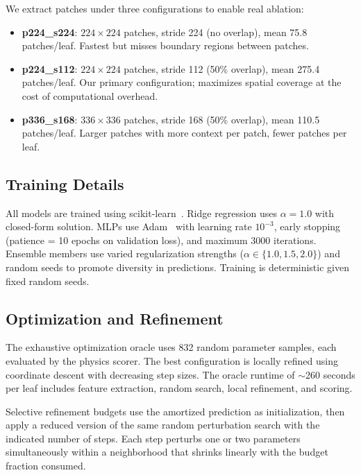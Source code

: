 \documentclass[11pt,a4paper]{article}
\begin{document}
We extract patches under three configurations to enable real ablation:
\begin{itemize}[nosep]
    \item \textbf{p224\_s224}: $224 \times 224$ patches, stride 224 (no overlap), mean 75.8 patches/leaf. Fastest but misses boundary regions between patches.
    \item \textbf{p224\_s112}: $224 \times 224$ patches, stride 112 (50\% overlap), mean 275.4 patches/leaf. Our primary configuration; maximizes spatial coverage at the cost of computational overhead.
    \item \textbf{p336\_s168}: $336 \times 336$ patches, stride 168 (50\% overlap), mean 110.5 patches/leaf. Larger patches with more context per patch, fewer patches per leaf.
\end{itemize}

\subsection{Training Details}

All models are trained using scikit-learn~\citep{scikit-learn}.
Ridge regression uses $\alpha = 1.0$ with closed-form solution.
MLPs use Adam~\citep{kingma2014adam} with learning rate $10^{-3}$, early stopping (patience = 10 epochs on validation loss), and maximum 3000 iterations.
Ensemble members use varied regularization strengths ($\alpha \in \{1.0, 1.5, 2.0\}$) and random seeds to promote diversity in predictions.
Training is deterministic given fixed random seeds.

\subsection{Optimization and Refinement}

The exhaustive optimization oracle uses 832 random parameter samples, each evaluated by the physics scorer.
The best configuration is locally refined using coordinate descent with decreasing step sizes.
The oracle runtime of $\sim$260 seconds per leaf includes feature extraction, random search, local refinement, and scoring.

Selective refinement budgets use the amortized prediction as initialization, then apply a reduced version of the same random perturbation search with the indicated number of steps.
Each step perturbs one or two parameters simultaneously within a neighborhood that shrinks linearly with the budget fraction consumed.
\end{document}
